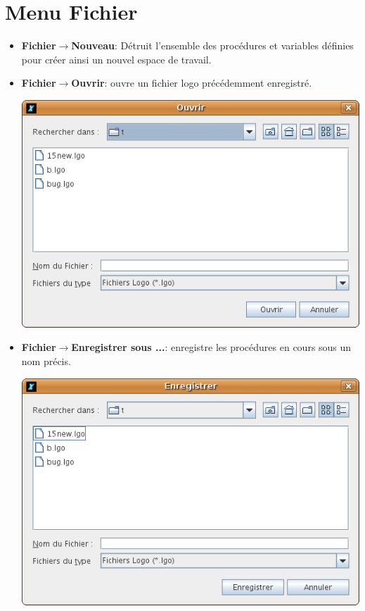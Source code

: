 \section{Menu \og Fichier \fg}
\begin{itemize}
\item \textbf{Fichier$\to$Nouveau}: Détruit l'ensemble des procédures et variables définies pour créer ainsi un nouvel espace de travail.\\
\item \textbf{Fichier$\to$Ouvrir}: ouvre un fichier logo précédemment enregistré.
\begin{center}
 \includegraphics[scale=0.4]{images/CaptureOuvrir.png}
\end{center}
\vspace{0.25cm}
\item \textbf{Fichier$\to$Enregistrer sous ...}: enregistre les procédures en cours
sous un nom précis.
\begin{center}
 \includegraphics[scale=0.4]{images/CaptureEnregistrer.png}

\end{center}
\end{itemize}
